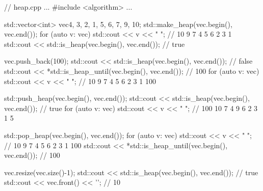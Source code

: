 \begin{cpp}
// heap.cpp
...
#include <algorithm>
...

std::vector<int> vec{4, 3, 2, 1, 5, 6, 7, 9, 10};
std::make_heap(vec.begin(), vec.end());
for (auto v: vec) std::cout << v << " "; // 10 9 7 4 5 6 2 3 1
std::cout << std::is_heap(vec.begin(), vec.end()); // true

vec.push_back(100);
std::cout << std::is_heap(vec.begin(), vec.end()); // false
std::cout << *std::is_heap_until(vec.begin(), vec.end()); // 100
for (auto v: vec) std::cout << v << " "; // 10 9 7 4 5 6 2 3 1 100

std::push_heap(vec.begin(), vec.end());
std::cout << std::is_heap(vec.begin(), vec.end()); // true
for (auto v: vec) std::cout << v << " "; // 100 10 7 4 9 6 2 3 1 5

std::pop_heap(vec.begin(), vec.end());
for (auto v: vec) std::cout << v << " "; // 10 9 7 4 5 6 2 3 1 100
std::cout << *std::is_heap_until(vec.begin(), vec.end()); // 100

vec.resize(vec.size()-1);
std::cout << std::is_heap(vec.begin(), vec.end()); // true
std::cout << vec.front() << '\n'; // 10
\end{cpp}













































